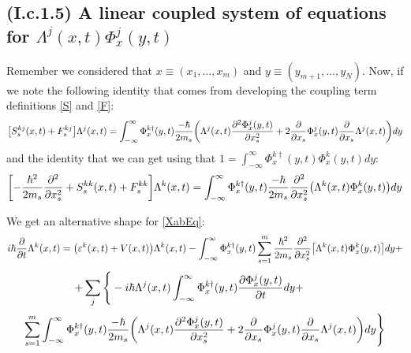 \documentclass[11pt, a4paper]{article} %
\begin{document}
\subsection*{(I.c.1.5) A linear coupled system of equations for $\Lambda^j(x,t) \Phi^j_x(y,t)$ }
\vspace{-0.3cm}

Remember we considered that $x\equiv (x_1,...,x_m)$ and $y\equiv (y_{m+1},...,y_N)$. Now, if we note the following identity that comes from developing the coupling term definitions \eqref{S} and \eqref{F}:
\begin{equation}
\qty[S^{kj}_s(x,t)+F_s^{kj}]\Lambda^j(x,t)=\int_{-\infty}^\infty \Phi^{k\dagger}_x(y,t) \frac{-\hbar}{2m_s}\qty( \Lambda^j(x,t)\pdv[2]{\Phi^j_x(y,t)}{x_s}+2\pdv{}{x_s}\Phi^j_x(y,t)\pdv{}{x_s}\Lambda^j(x,t) ) dy
\end{equation}
and the identity that we can get using that $1=\int_{-\infty}^\infty \Phi^{k\dagger}_x(y,t) \Phi^k_x(y,t)dy$:
\begin{equation}
\qty[-\frac{\hbar^2}{2m_s}\pdv[2]{}{x_s}+S^{kk}_s(x,t)+F_s^{kk}]\Lambda^k(x,t)=\int_{-\infty}^\infty \Phi^{k\dagger}_x(y,t) \frac{-\hbar}{2m_s} \pdv[2]{}{x_s}\qty(\Lambda^k(x,t)\Phi^k_x(y,t))dy
\end{equation}

We get an alternative shape for \eqref{XabEq}:
\begin{equation}
i\hbar \pdv{}{t}\Lambda^k(x,t)=\qty( \varepsilon^k(x,t)+V(x,t) )\Lambda^k(x,t) -\int_{-\infty}^\infty \Phi^{k\dagger}_x(y,t) \sum_{s=1}^m\frac{\hbar^2}{2m_s}\pdv[2]{}{x_s}\qty[\Lambda^k(x,t)\Phi^k_x(y,t) ]dy+
\end{equation}
$$
\hspace*{-1cm}
    +\sum_j\Bigg\{-i\hbar \Lambda^j(x,t)\int_{-\infty}^\infty \Phi^{k\dagger}_x(y,t)\pdv{\Phi^j_x(y,t)}{t}dy+
$$
$$
\sum_{s=1}^m\int_{-\infty}^\infty \Phi^{k\dagger}_x(y,t) \frac{-\hbar}{2m_s}\qty( \Lambda^j(x,t)\pdv[2]{\Phi^j_x(y,t)}{x_s}+2\pdv{}{x_s}\Phi^j_x(y,t)\pdv{}{x_s}\Lambda^j(x,t) ) dy\Bigg\}
$$
\end{document}
